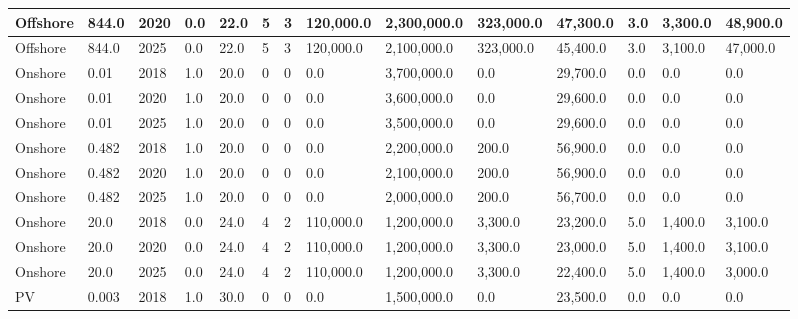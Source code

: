 \begin{table*}[]
\begin{tabularx}{\linewidth}{|p{}|l|x|l|l|l|l|l|l|l|l|l|l|l|}
Offshore                      & 844.0       & 2020             & 0.0    & 22.0 & 5     & 3     & 120,000.0 & 2,300,000.0 & 323,000.0 & 47,300.0 & 3.0   & 3,300.0  & 48,900.0  \\ \hline
Offshore                      & 844.0       & 2025             & 0.0    & 22.0 & 5     & 3     & 120,000.0 & 2,100,000.0 & 323,000.0 & 45,400.0 & 3.0   & 3,100.0  & 47,000.0  \\ \hline
Onshore                       & 0.01        & 2018             & 1.0    & 20.0 & 0     & 0     & 0.0       & 3,700,000.0 & 0.0       & 29,700.0 & 0.0   & 0.0      & 0.0       \\ \hline
Onshore                       & 0.01        & 2020             & 1.0    & 20.0 & 0     & 0     & 0.0       & 3,600,000.0 & 0.0       & 29,600.0 & 0.0   & 0.0      & 0.0       \\ \hline
Onshore                       & 0.01        & 2025             & 1.0    & 20.0 & 0     & 0     & 0.0       & 3,500,000.0 & 0.0       & 29,600.0 & 0.0   & 0.0      & 0.0       \\ \hline
Onshore                       & 0.482       & 2018             & 1.0    & 20.0 & 0     & 0     & 0.0       & 2,200,000.0 & 200.0     & 56,900.0 & 0.0   & 0.0      & 0.0       \\ \hline
Onshore                       & 0.482       & 2020             & 1.0    & 20.0 & 0     & 0     & 0.0       & 2,100,000.0 & 200.0     & 56,900.0 & 0.0   & 0.0      & 0.0       \\ \hline
Onshore                       & 0.482       & 2025             & 1.0    & 20.0 & 0     & 0     & 0.0       & 2,000,000.0 & 200.0     & 56,700.0 & 0.0   & 0.0      & 0.0       \\ \hline
Onshore                       & 20.0        & 2018             & 0.0    & 24.0 & 4     & 2     & 110,000.0 & 1,200,000.0 & 3,300.0   & 23,200.0 & 5.0   & 1,400.0  & 3,100.0   \\ \hline
Onshore                       & 20.0        & 2020             & 0.0    & 24.0 & 4     & 2     & 110,000.0 & 1,200,000.0 & 3,300.0   & 23,000.0 & 5.0   & 1,400.0  & 3,100.0   \\ \hline
Onshore                       & 20.0        & 2025             & 0.0    & 24.0 & 4     & 2     & 110,000.0 & 1,200,000.0 & 3,300.0   & 22,400.0 & 5.0   & 1,400.0  & 3,000.0   \\ \hline
PV                            & 0.003       & 2018             & 1.0    & 30.0 & 0     & 0     & 0.0       & 1,500,000.0 & 0.0       & 23,500.0 & 0.0   & 0.0      & 0.0       \\ \hline

\end{tabularx}
\end{table*}
